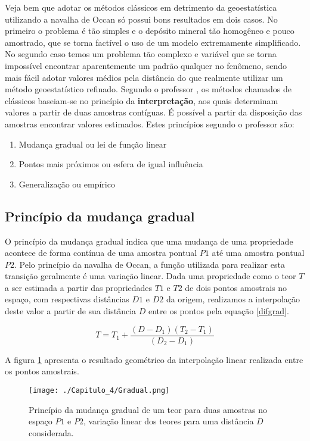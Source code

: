   Veja bem que adotar os métodos clássicos em detrimento da geoestatística utilizando a navalha de Occan só possui bons resultados em dois casos. No primeiro o problema é tão simples e o depósito mineral tão homogêneo  e pouco amostrado, que se torna factível o uso de um modelo extremamente simplificado. No segundo caso temos um problema tão complexo e variável que se torna impossível encontrar aparentemente um padrão qualquer no fenômeno, sendo mais fácil adotar valores médios pela distância do que realmente utilizar um método geoestatístico refinado.  Segundo o professor \cite{yamamoto2001avaliaccao} , os métodos chamados de clássicos baseiam-se no princípio da \textbf{interpretação}, aos quais determinam valores a partir de duas amostras contíguas. É possível a partir da disposição das amostras encontrar valores estimados. Estes princípios segundo o professor são: 
  
  \begin{enumerate}
  	\item Mudança gradual ou lei de função linear 
  	\item Pontos mais próximos ou esfera de igual influência 
  	\item Generalização ou empírico
  \end{enumerate}
 
\subsection{Princípio da mudança gradual} 

O princípio da mudança gradual indica que uma mudança de uma propriedade acontece de forma contínua de uma amostra pontual $P1$ até uma amostra pontual $P2$. Pelo princípio da navalha de Occan, a função utilizada para realizar esta transição geralmente é uma variação linear. Dada uma propriedade como o teor $T$ a ser estimada a partir das propriedades $T1$ e $T2$ de dois pontos amostrais no espaço, com respectivas distâncias $D1$ e $D2$ da origem, realizamos a interpolação deste valor a partir de sua distância $D$ entre os pontos pela equação \eqref{difgrad}.

\begin{equation}\label{difgrad}
	T=T_{1}+ \frac{(D-D_{1})(T_{2}- T_{1})}{(D_{2} - D_{1})}
\end{equation}

A figura \ref{mudgrad} apresenta o resultado geométrico  da interpolação linear realizada entre os pontos amostrais. 

\FloatBarrier
\begin{figure}[!htpb]
	\centering
	\texttt{[image: ./Capitulo\_4/Gradual.png]}	
	\caption{Princípio da mudança gradual de um teor para duas amostras no espaço $P1$ e $P2$, variação linear dos teores para uma distância $D$ considerada.}
	\label{mudgrad}
\end{figure}
\FloatBarrier


